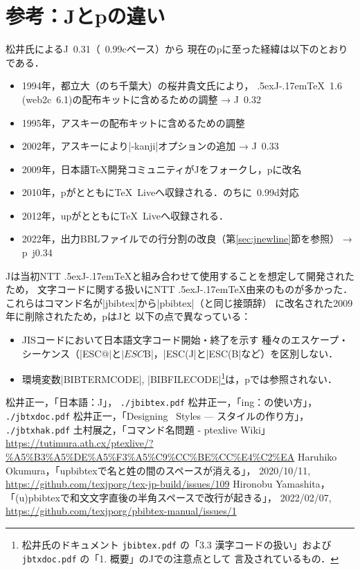 \documentclass[a4paper,11pt,nomag,dvipdfmx]{jsarticle}
\def\file#1{\texttt{#1}}
\def\JTeX{\leavevmode\textcompwordmark\lower.5ex\hbox{J}\kern-.17em\TeX}
\def\JBibTeX{\leavevmode\textcompwordmark\lower.5ex\hbox{J}\kern-.08em\BibTeX}
\def\pBibTeX{p\kern-.05em\BibTeX}
\def\upBibTeX{u\pBibTeX}
\def\JBibTeX{J\BibTeX}%
\def\pBibTeX{p\BibTeX}%
\def\upBibTeX{u\pBibTeX}%
\def\TL{\TeX\ Live}
\begin{document}
\section{参考：\JBibTeX と\pBibTeX の違い}\label{diff}

松井氏による\JBibTeX~0.31（\BibTeX~0.99cベース）から
現在の\pBibTeX に至った経緯は以下のとおりである．
\begin{itemize}
 \item 1994年，都立大（のち千葉大）の桜井貴文氏により，
   \JTeX~1.6 (web2c~6.1)の配布キットに含めるための調整 → \JBibTeX~0.32
 \item 1995年，アスキー\pTeX の配布キットに含めるための調整
 \item 2002年，アスキーにより|-kanji|オプションの追加 → \JBibTeX~0.33
 \item 2009年，日本語\TeX 開発コミュニティが\JBibTeX をフォークし，\pBibTeX に改名
 \item 2010年，\pBibTeX が\pTeX とともに\TL へ収録される．のちに\BibTeX~0.99d対応
 \item 2012年，\upBibTeX が\upTeX とともに\TL へ収録される．
 \item 2022年，出力BBLファイルでの行分割の改良（第\ref{sec:jnewline}節を参照） → \pBibTeX~j0.34
\end{itemize}

\JBibTeX は当初NTT \JTeX と組み合わせて使用することを想定して開発されたため，
文字コードに関する扱いにNTT \JTeX 由来のものが多かった．
これらはコマンド名が|jbibtex|から|pbibtex|（\pTeX と同じ接頭辞）
に改名された2009年に削除された\cite{ptexlive}ため，\pBibTeX は\JBibTeX と
以下の点で異なっている：
\begin{itemize}
 \item JISコードにおいて日本語文字コード開始・終了を示す
  種々のエスケープ・シーケンス（|ESC$@|と|ESC$B|，|ESC(J|と|ESC(B|など）を区別しない．
 \item 環境変数|BIBTERMCODE|, |BIBFILECODE|\footnote{松井氏のドキュメント
  \file{jbibtex.pdf} \cite{jbibtex}の「3.3 漢字コードの扱い」および
  \file{jbtxdoc.pdf} \cite{jbtxdoc}の「1. 概要」の\JBibTeX での注意点として
  言及されているもの．}は，\pBibTeX では参照されない．
\end{itemize}


\clearpage
\begin{thebibliography}{99}
  松井正一，「日本語\BibTeX ：\JBibTeX」，
  \file{./jbibtex.pdf}
  松井正一，「\BibTeX ing：\BibTeX の使い方」，
  \file{./jbtxdoc.pdf}
  松井正一，「Designing \BibTeX\ Styles --- \BibTeX スタイルの作り方」，
  \file{./jbtxhak.pdf}
  土村展之，「コマンド名問題 - ptexlive Wiki」\\
  \url{https://tutimura.ath.cx/ptexlive/?%A5%B3%A5%DE%A5%F3%A5%C9%CC%BE%CC%E4%C2%EA}
  Haruhiko Okumura，「upbibtexで名と姓の間のスペースが消える」，
  2020/10/11,\\
  \url{https://github.com/texjporg/tex-jp-build/issues/109}
  Hironobu Yamashita，「(u)pbibtexで和文文字直後の半角スペースで改行が起きる」，
  2022/02/07,\\
  \url{https://github.com/texjporg/pbibtex-manual/issues/1}
\end{thebibliography}
\end{document}
